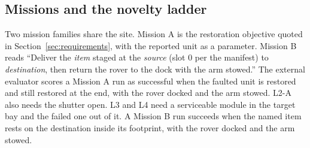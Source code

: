 \begin{figure}[t]
  \centering
  \caption{}
  \label{fig:site}
\end{figure}

\subsection{Missions and the novelty ladder}
\label{sec:setup-missions}

Two mission families share the site. Mission A is the restoration objective quoted in Section~\ref{sec:requirements},
with the reported unit as a parameter. Mission B reads ``Deliver the \emph{item} staged at the \emph{source} (slot 0
per the manifest) to \emph{destination}, then return the rover to the dock with the arm stowed.'' The external evaluator
scores a Mission A run as successful when the faulted unit is restored and still restored at the end, with the rover
docked and the arm stowed. L2-A also needs the shutter open. L3 and L4 need a serviceable module in the target bay and
the failed one out of it. A Mission B run succeeds when the named item rests on the destination inside its footprint,
with the rover docked and the arm stowed.

